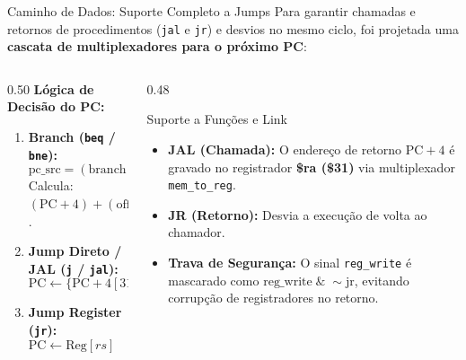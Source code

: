 \documentclass[aspectratio=169, 11pt]{beamer}
\begin{document}
\begin{frame}{Caminho de Dados: Suporte Completo a Jumps}
  Para garantir chamadas e retornos de procedimentos (\texttt{jal} e \texttt{jr}) e desvios no mesmo ciclo, foi projetada uma \textbf{cascata de multiplexadores para o próximo PC}:

  \vspace{0.3cm}
  \begin{columns}[T]
    \begin{column}{0.50\textwidth}
      \textbf{Lógica de Decisão do PC:}
      \begin{enumerate}\setlength{\itemsep}{6pt}
        \item \textbf{Branch (\texttt{beq} / \texttt{bne}):}
          $$\text{pc\_src} = (\text{branch} \;\&\; \text{zero}) \;|\; (\text{bne} \;\&\; \sim\text{zero})$$
          Calcula: $(\text{PC}+4) + (\text{offset} \ll 2)$.
        \item \textbf{Jump Direto / JAL (\texttt{j} / \texttt{jal}):}
          $$\text{PC} \leftarrow \{\text{PC}+4[31:28],\; \text{target}[25:0],\; \text{2'b00}\}$$
        \item \textbf{Jump Register (\texttt{jr}):}
          $$\text{PC} \leftarrow \text{Reg}[rs] \quad (\text{normalmente } \text{Reg}[\$ra])$$
      \end{enumerate}
    \end{column}

    \begin{column}{0.48\textwidth}
      \begin{exampleblock}{Suporte a Funções e Link}
        \begin{itemize}\setlength{\itemsep}{6pt}
          \item \textbf{JAL (Chamada):} O endereço de retorno $\text{PC}+4$ é gravado no registrador \textbf{\$ra (\$31)} via multiplexador \texttt{mem\_to\_reg}.
          \item \textbf{JR (Retorno):} Desvia a execução de volta ao chamador.
          \item \textbf{Trava de Segurança:} O sinal \texttt{reg\_write} é mascarado como $\text{reg\_write} \;\&\; \sim\text{jr}$, evitando corrupção de registradores no retorno.
        \end{itemize}
      \end{exampleblock}
    \end{column}
  \end{columns}
\end{frame}
\end{document}
